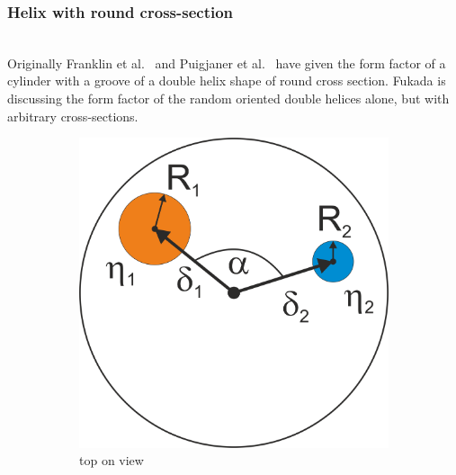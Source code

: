 \subsubsection{Helix with round cross-section} ~\\
Originally Franklin et al.\ \cite{Franklin1956} and Puigjaner et al.\ \cite{Puigjaner1974} have given the form factor of a cylinder with a groove of a double helix shape of round cross section. Fukada \cite{Fukuda2002} is discussing the form factor of the random oriented double helices alone, but with arbitrary cross-sections.
\begin{figure}[htb]
\begin{subfigure}[b]{.48\textwidth}
   \centering
   \includegraphics[width=1\textwidth]{../images/form_factor/cylindrical_obj/roundhelices1.png}
   \caption{top on view}
   \label{fig:roundhelix1}
\end{subfigure}
\hfill
\begin{subfigure}[b]{.48\textwidth}
   \centering

\end{subfigure}
\end{figure}
